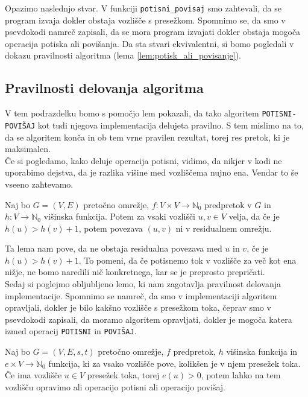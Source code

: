 \documentclass[mat1]{fmfdelo}
\newcommand{\N}{\mathbb N}
\begin{document}
Opazimo naslednjo stvar. V funkciji \texttt{potisni\_povisaj} smo zahtevali, da se program izvaja dokler obstaja vozlišče s presežkom. Spomnimo se, da smo v psevdokodi namreč zapisali, da se mora program izvajati dokler obstaja mogoča operacija potiska ali povišanja. Da sta stvari ekvivalentni, si bomo pogledali v dokazu pravilnosti algoritma (lema \ref{lem:potisk_ali_povisanje}).



\subsection{Pravilnosti delovanja algoritma}

V tem podrazdelku bomo s pomočjo lem pokazali, da tako algoritem \texttt{POTISNI-POVIŠAJ} kot tudi njegova implementacija delujeta pravilno. S tem mislimo na to, da se algoritem konča in ob tem vrne pravilen rezultat, torej res pretok, ki je maksimalen.\\

Če si pogledamo, kako deluje operacija potisni, vidimo, da nikjer v kodi ne uporabimo dejstva, da je razlika višine med vozliščema nujno ena. Vendar to še vseeno zahtevamo.

\begin{lema}
Naj bo $G = (V,E)$ pretočno omrežje, $f\colon V \times V \rightarrow \N_0$ predpretok v $G$ in $h\colon V \rightarrow \N_0$ višinska funkcija. Potem za vsaki vozlišči $u,v \in V$ velja, da če je $h(u) > h(v) + 1$, potem povezava $(u,v)$ ni v residualnem omrežju.
\end{lema}

Ta lema nam pove, da ne obstaja residualna povezava med $u$ in $v$, če je $h(u) > h(v) + 1$. To pomeni, da če potisnemo tok v vozlišče za več kot ena nižje, ne bomo naredili nič konkretnega, kar se je preprosto prepričati.\\


Sedaj si poglejmo obljubljeno lemo, ki nam zagotavlja pravilnost delovanja implementacije. Spomnimo se namreč, da smo v implementaciji algoritem opravljali, dokler je bilo kakšno vozlišče s presežkom toka, čeprav smo v psevdokodi zapisali, da moramo algoritem opravljati, dokler je mogoča katera izmed operacij \texttt{POTISNI} in \texttt{POVIŠAJ}.

\begin{lema}\label{lem:potisk_ali_povisanje}
Naj bo $G=(V,E,s,t)$ pretočno omrežje, $f$ predpretok, $h$ višinska funkcija in $e\times V \rightarrow \N_0$ funkcija, ki za vsako vozlišče pove, kolikšen je v njem presežek toka. Če ima vozlišče $u\in V$ presežek toka, torej $e(u) > 0$, potem lahko na tem vozlišču opravimo ali operacijo potisni ali operacijo povišaj.
\end{lema}
\end{document}
